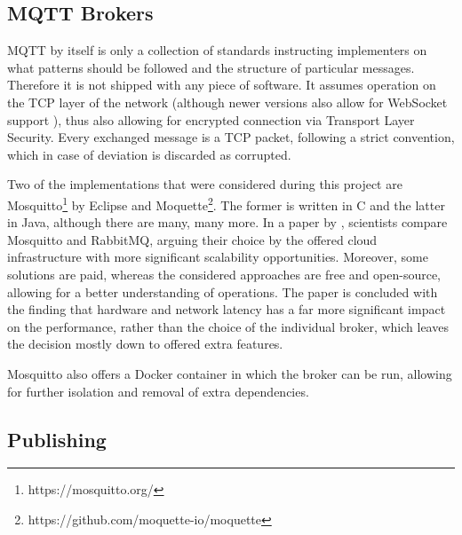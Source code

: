 \subsection{MQTT Brokers}
MQTT by itself is only a collection of standards instructing implementers on what patterns should be followed and the structure of particular messages. Therefore it is not shipped with any piece of software. It assumes operation on the TCP layer of the network (although newer versions also allow for WebSocket support \citep{mijovic2016comparing}), thus also allowing for encrypted connection via Transport Layer Security. Every exchanged message is a TCP packet, following a strict convention, which in case of deviation is discarded as corrupted.

Two of the implementations that were considered during this project are Mosquitto\footnote{https://mosquitto.org/} by Eclipse and Moquette\footnote{https://github.com/moquette-io/moquette}. The former is written in C and the latter in Java, although there are many, many more. In a paper by \citet{de2019performance}, scientists compare Mosquitto and RabbitMQ, arguing their choice by the offered cloud infrastructure with more significant scalability opportunities. Moreover, some solutions are paid, whereas the considered approaches are free and open-source, allowing for a better understanding of operations. The paper is concluded with the finding that hardware and network latency has a far more significant impact on the performance, rather than the choice of the individual broker, which leaves the decision mostly down to offered extra features.

Mosquitto also offers a Docker container \cite{light2017mosquitto} in which the broker can be run, allowing for further isolation and removal of extra dependencies.

\subsection{Publishing}\label{sec:pub}

